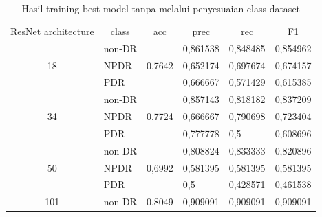     \begin{table}[H]
        \begin{center}
        \caption{Hasil training best model tanpa melalui penyesuaian class dataset}
        \label{tb:HasilTrainClassWeight}
            \begin{tabular}{clclll}
            \cline{1-6}
            ResNet   architecture & \multicolumn{1}{c}{class} & acc                     & \multicolumn{1}{c}{prec} & \multicolumn{1}{c}{rec} & \multicolumn{1}{c}{F1} \\ \cline{1-6}
            \multirow{3}{*}{18}   & non-DR                    & \multirow{3}{*}{0,7642} & 0,861538                 & 0,848485                & 0,854962               \\
                                  & NPDR                      &                         & 0,652174                 & 0,697674                & 0,674157               \\
                                  & PDR                       &                         & 0,666667                 & 0,571429                & 0,615385               \\ \cline{1-6}
            \multirow{3}{*}{34}   & non-DR                    & \multirow{3}{*}{0,7724} & 0,857143                 & 0,818182                & 0,837209               \\
                                  & NPDR                      &                         & 0,666667                 & 0,790698                & 0,723404               \\
                                  & PDR                       &                         & 0,777778                 & 0,5                     & 0,608696               \\ \cline{1-6}
            \multirow{3}{*}{50}   & non-DR                    & \multirow{3}{*}{0,6992} & 0,808824                 & 0,833333                & 0,820896               \\
                                  & NPDR                      &                         & 0,581395                 & 0,581395                & 0,581395               \\
                                  & PDR                       &                         & 0,5                      & 0,428571                & 0,461538               \\ \cline{1-6}
            \multirow{3}{*}{101}  & non-DR                    & \multirow{3}{*}{0,8049} & 0,909091                 & 0,909091                & 0,909091               \\

\end{tabular}
\end{center}
\end{table}
